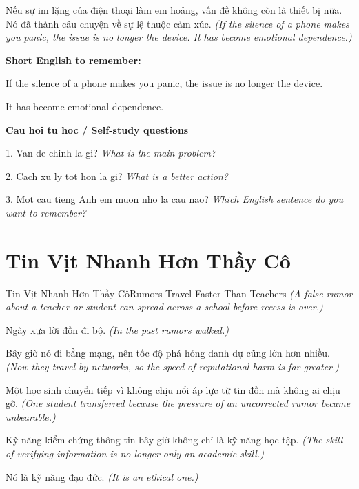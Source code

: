 \begin{baihoc}
Nếu sự im lặng của điện thoại làm em hoảng, vấn đề không còn là thiết bị nữa. Nó đã thành câu chuyện về sự lệ thuộc cảm xúc.
\textit{(If the silence of a phone makes you panic, the issue is no longer the device. It has become emotional dependence.)}
\end{baihoc}

\begin{ghinhoanh}
\textbf{Short English to remember:}

If the silence of a phone makes you panic, the issue is no longer the device.

It has become emotional dependence.

\end{ghinhoanh}

\begin{tuhocnhanh}
\textbf{Cau hoi tu hoc / Self-study questions}

1. Van de chinh la gi? \textit{What is the main problem?}

2. Cach xu ly tot hon la gi? \textit{What is a better action?}

3. Mot cau tieng Anh em muon nho la cau nao? \textit{Which English sentence do you want to remember?}
\end{tuhocnhanh}
\ngancach

\section{Tin Vịt Nhanh Hơn Thầy Cô}
\begin{truyen}{Tin Vịt Nhanh Hơn Thầy Cô}{Rumors Travel Faster Than Teachers}
\textit{(A false rumor about a teacher or student can spread across a school before recess is over.)}

Ngày xưa lời đồn đi bộ.
\textit{(In the past rumors walked.)}

Bây giờ nó đi bằng mạng, nên tốc độ phá hỏng danh dự cũng lớn hơn nhiều.
\textit{(Now they travel by networks, so the speed of reputational harm is far greater.)}

Một học sinh chuyển tiếp vì không chịu nổi áp lực từ tin đồn mà không ai chịu gỡ.
\textit{(One student transferred because the pressure of an uncorrected rumor became unbearable.)}

Kỹ năng kiểm chứng thông tin bây giờ không chỉ là kỹ năng học tập.
\textit{(The skill of verifying information is no longer only an academic skill.)}

Nó là kỹ năng đạo đức.
\textit{(It is an ethical one.)}

\end{truyen}

